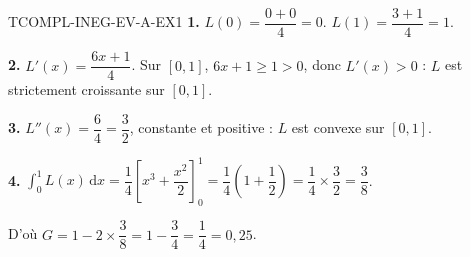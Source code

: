 \begin{corrige}{TCOMPL-INEG-EV-A-EX1}
\textbf{1.} $L(0) = \dfrac{0+0}{4} = 0$. $L(1) = \dfrac{3+1}{4} = 1$.

\textbf{2.} $L'(x) = \dfrac{6x+1}{4}$. Sur $[0,1]$, $6x+1 \geq 1 > 0$, donc $L'(x)>0$ : $L$ est strictement croissante sur $[0,1]$.

\textbf{3.} $L''(x) = \dfrac{6}{4} = \dfrac{3}{2}$, constante et positive : $L$ est convexe sur $[0,1]$.

\textbf{4.} $\displaystyle\int_0^1 L(x)\,\mathrm{d}x = \dfrac{1}{4}\left[x^3+\dfrac{x^2}{2}\right]_0^1 = \dfrac{1}{4}\left(1+\dfrac{1}{2}\right) = \dfrac{1}{4}\times\dfrac{3}{2} = \dfrac{3}{8}$.

D'où $G = 1-2\times\dfrac{3}{8} = 1-\dfrac{3}{4} = \dfrac{1}{4} = 0{,}25$.
\end{corrige}
